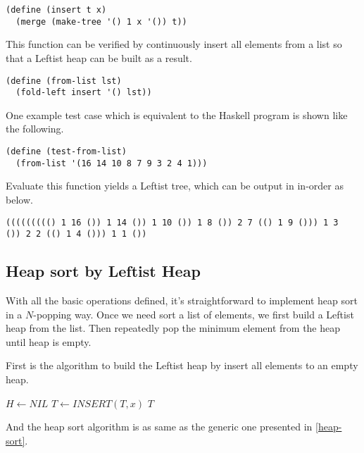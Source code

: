 \documentclass{article}
\begin{document}
\lstset{language=lisp}
\begin{lstlisting}
(define (insert t x)
  (merge (make-tree '() 1 x '()) t))
\end{lstlisting}

This function can be verified by continuously insert all elements
from a list so that a Leftist heap can be built as a result.

\begin{lstlisting}
(define (from-list lst)
  (fold-left insert '() lst))
\end{lstlisting}

One example test case which is equivalent to the Haskell program
is shown like the following.

\begin{lstlisting}
(define (test-from-list)
  (from-list '(16 14 10 8 7 9 3 2 4 1)))
\end{lstlisting}

Evaluate this function yields a Leftist tree, which can be output
in in-order as below.

\begin{lstlisting}
((((((((() 1 16 ()) 1 14 ()) 1 10 ()) 1 8 ()) 2 7 (() 1 9 ())) 1 3 
()) 2 2 (() 1 4 ())) 1 1 ())
\end{lstlisting}

\subsection{Heap sort by Leftist Heap}

With all the basic operations defined, it's straightforward to 
implement heap sort in a $N$-popping way. Once we need sort a
list of elements, we first build a Leftist heap from the list.
Then repeatedly pop the minimum element from the heap until heap
is empty.

First is the algorithm to build the Leftist heap by insert all
elements to an empty heap.

\begin{algorithmic}[1]
  \State $H \gets NIL$
    \State $T \gets INSERT(T, x)$
  \EndFor
  \State \Return $T$
\EndFunction
\end{algorithmic}

And the heap sort algorithm is as same as the generic one presented
in \ref{heap-sort}.
\end{document}
